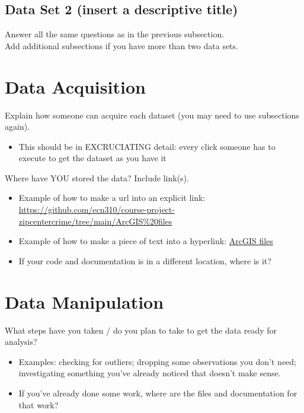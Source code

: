 \documentclass[12pt]{article}
\begin{document}
\subsection{Data Set 2 (insert a descriptive title)}

Answer all the same questions as in the previous subsection. \\

\noindent Add additional subsections if you have more than two data sets.


\section{Data Acquisition}
\label{sec:theory}

Explain how someone can acquire each dataset (you may need to use subsections again).
\begin{itemize}
    \item This should be in EXCRUCIATING detail: every click someone has to execute to get the dataset as you have it
\end{itemize}

\noindent Where have YOU stored the data? Include link(s).
\begin{itemize}
    \item Example of how to make a url into an explicit link: \url{https://github.com/ecn310/course-project-zipcentercrime/tree/main/ArcGIS%20files}
    \item Example of how to make a piece of text into a hyperlink: \href{https://github.com/ecn310/course-project-zipcentercrime/tree/main/ArcGIS%20files}{ArcGIS files}
    \item If your code and documentation is in a different location, where is it?
\end{itemize}


\section{Data Manipulation}
\label{sec:data}

What steps have you taken / do you plan to take to get the data ready for analysis? 
\begin{itemize}
    \item Examples: checking for outliers; dropping some observations you don't need; investigating something you've already noticed that doesn't make sense.
    \item If you've already done some work, where are the files and documentation for that work?
\end{itemize}
\end{document}
